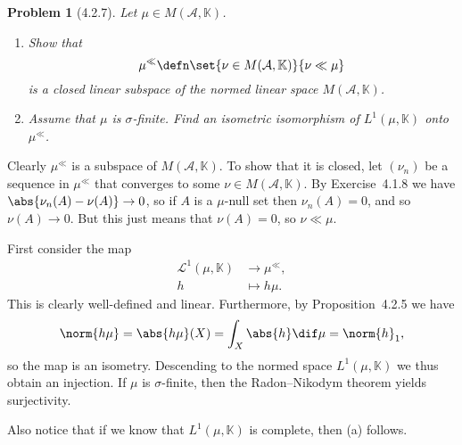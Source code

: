 \documentclass[a4paper, 11pt]{memoir}
\theoremstyle{plaincustomnumber}
\newtheorem{problem}{Problem}
\theoremstyle{changedotbreakcustomnumber}
\newcommand{\calL}{\mathcal{L}}
\newcommand{\calA}{\mathcal{A}}
\newcommand{\fieldK}{\mathbb{K}}
\begin{document}
\begin{problem}[4.2.7]
    Let $\mu \in M(\calA,\fieldK)$.
    \begin{enumerate}
        \item Show that
        \begin{equation*}
            \mu^\ll
                \defn \set{\nu \in M(\calA,\fieldK)}{\nu \ll \mu}
        \end{equation*}
        is a closed linear subspace of the normed linear space $M(\calA,\fieldK)$.

        \item Assume that $\mu$ is $\sigma$-finite. Find an isometric isomorphism of $L^1(\mu,\fieldK)$ onto $\mu^\ll$.
    \end{enumerate}
\end{problem}

\begin{solution}
\begin{solutionsec}
    \item Clearly $\mu^\ll$ is a subspace of $M(\calA,\fieldK)$. To show that it is closed, let $(\nu_n)$ be a sequence in $\mu^\ll$ that converges to some $\nu \in M(\calA,\fieldK)$. By Exercise~4.1.8 we have $\abs{\nu_n(A) - \nu(A)} \to 0$, so if $A$ is a $\mu$-null set then $\nu_n(A) = 0$, and so $\nu(A) \to 0$. But this just means that $\nu(A) = 0$, so $\nu \ll \mu$.
    
    \item First consider the map
    \begin{align*}
        \calL^1(\mu,\fieldK) &\to \mu^\ll, \\
        h &\mapsto h \mu.
    \end{align*}
    This is clearly well-defined and linear. Furthermore, by Proposition~4.2.5 we have
    \begin{equation*}
        \norm{h \mu}
            = \abs{h \mu}(X)
            = \int_X \abs{h} \dif\mu
            = \norm{h}_1,
    \end{equation*}
    so the map is an isometry. Descending to the normed space $L^1(\mu,\fieldK)$ we thus obtain an injection. If $\mu$ is $\sigma$-finite, then the Radon--Nikodym theorem yields surjectivity.

    Also notice that if we know that $L^1(\mu,\fieldK)$ is complete, then (a) follows.
\end{solutionsec}
\end{solution}
\end{document}
